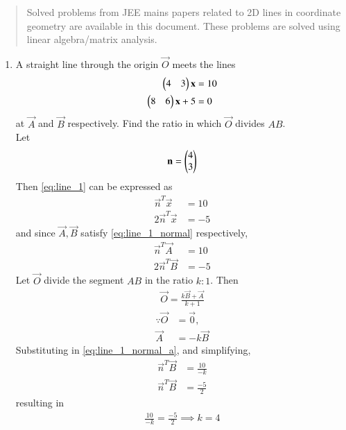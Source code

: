 \documentclass[journal,12pt,twocolumn]{IEEEtran}
\begin{document}
\begin{abstract}
	Solved problems from JEE mains papers related to 2D lines in coordinate geometry are 
available in this document.  These problems are solved using linear algebra/matrix analysis.
\end{abstract}
\begin{enumerate}[label=\arabic*]

\item A straight line through the origin   $\vec{O}$ meets the lines
\begin{align} 
\label{eq:line_1}
\begin{pmatrix}4 & 3\end{pmatrix}\mathbf{x} &= 10
\\
\begin{pmatrix}8 & 6\end{pmatrix}\mathbf{x} +5&= 0
\end{align} 
%
at $\vec{A}$ and $\vec{B}$ respectively.  Find the ratio in which  $\vec{O}$ divides $AB$.
\\
\solution Let 
\begin{align} 
\mathbf{n} =\begin{pmatrix}4 \\ 3\end{pmatrix}
\end{align} 
%
Then \eqref{eq:line_1} can be expressed as
\begin{align} 
\label{eq:line_1_normal}
\vec{n}^T\vec{x} &= 10
\\
2\vec{n}^T\vec{x} &= -5
\end{align} 
%
and since $\vec{A}, \vec{B}$ satisfy \eqref{eq:line_1_normal} respectively,
\begin{align} 
\label{eq:line_1_normal_a}
\vec{n}^T\vec{A} &= 10
\\
2\vec{n}^T\vec{B} &= -5
\label{eq:line_1_normal_b}
\end{align} 
%
Let  $\vec{O}$ divide the segment $AB$ in the ratio $k:1$. Then
\begin{align} 
\label{eq:line_1_section}
\vec{O}=\frac{k\vec{B} +\vec{A} }{k+1}
\end{align} 
%
\begin{align} 
\because \vec{O}&= \vec{0},
\\
\vec{A} &=-k\vec{B}
\end{align} 
%
Substituting in \eqref{eq:line_1_normal_a}, and simplifying, 
\begin{align} 
\label{eq:line_1_normal_subs_a}
\vec{n}^T\vec{B} &= \frac{10}{-k}
\\
\vec{n}^T\vec{B} &= \frac{-5}{2}
\end{align} 
resulting in 
\begin{align} 
\frac{10}{-k} = \frac{-5}{2} \implies k = 4

\end{align}
\end{enumerate}
\end{document}
